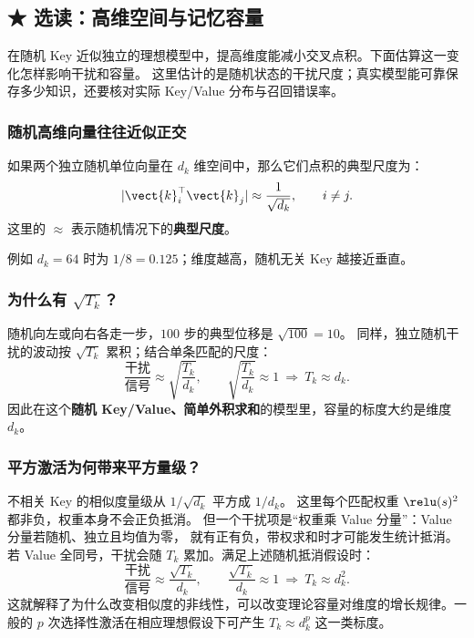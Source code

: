 \subsection{\texorpdfstring{{\symboliconfont ★}}{★} 选读：高维空间与记忆容量}\label{sec:memory-capacity}


在随机 Key 近似独立的理想模型中，提高维度能减小交叉点积。下面估算这一变化怎样影响干扰和容量。
这里估计的是随机状态的干扰尺度；真实模型能可靠保存多少知识，还要核对实际 Key/Value 分布与召回错误率。

\subsubsection{随机高维向量往往近似正交}
如果两个独立随机单位向量在 $d_k$ 维空间中，那么它们点积的典型尺度为：
\begin{equation}
|\vect{k}_i^\top\vect{k}_j|\approx\frac{1}{\sqrt{d_k}},\qquad i\ne j.
\end{equation}
这里的 $\approx$ 表示随机情况下的\textbf{典型尺度}。

例如 $d_k=64$ 时为 $1/8=0.125$；维度越高，随机无关 Key 越接近垂直。

\subsubsection{为什么有 \texorpdfstring{$\sqrt{T_k}$}{记忆条数的平方根}？}
随机向左或向右各走一步，$100$ 步的典型位移是 $\sqrt{100}=10$。
同样，独立随机干扰的波动按 $\sqrt{T_k}$ 累积；结合单条匹配的尺度：
\begin{equation}
\frac{\text{干扰}}{\text{信号}}\approx\sqrt{\frac{T_k}{d_k}},\qquad
\sqrt{\frac{T_k}{d_k}}\approx1\ \Rightarrow\ T_k\approx d_k.
\end{equation}
因此在这个\textbf{随机 Key/Value、简单外积求和}的模型里，容量的标度大约是维度 $d_k$。

\subsubsection{平方激活为何带来平方量级？}
不相关 Key 的相似度量级从 $1/\sqrt{d_k}$ 平方成 $1/d_k$。
这里每个匹配权重 $\relu(s)^2$ 都非负，权重本身不会正负抵消。
但一个干扰项是“权重乘 Value 分量”：Value 分量若随机、独立且均值为零，
就有正有负，带权求和时才可能发生统计抵消。
若 Value 全同号，干扰会随 $T_k$ 累加。满足上述随机抵消假设时：
\begin{equation}
\frac{\text{干扰}}{\text{信号}}\approx\frac{\sqrt{T_k}}{d_k},\qquad
\frac{\sqrt{T_k}}{d_k}\approx1\ \Rightarrow\ T_k\approx d_k^2.
\end{equation}
这就解释了为什么改变相似度的非线性，可以改变理论容量对维度的增长规律。一般的 $p$ 次选择性激活在相应理想假设下可产生 $T_k\approx d_k^p$ 这一类标度。

